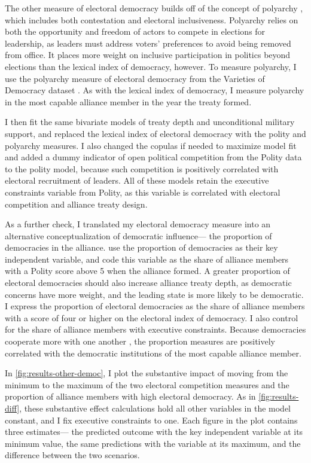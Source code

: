 \documentclass[12pt]{article}
\begin{document}
The other measure of electoral democracy builds off of the concept of polyarchy \citep{Dahl1971}, which includes both contestation and electoral inclusiveness. 
Polyarchy relies on both the opportunity and freedom of actors to compete in elections for leadership, as leaders must address voters' preferences to avoid being removed from office. 
It places more weight on inclusive participation in politics beyond elections than the lexical index of democracy, however. 
To measure polyarchy, I use the polyarchy measure of electoral democracy from the Varieties of Democracy dataset \citep{Teorelletal2016}.
As with the lexical index of democracy, I measure polyarchy in the most capable alliance member in the year the treaty formed.

 
I then fit the same bivariate models of treaty depth and unconditional military support, and replaced the lexical index of electoral democracy with the polity and polyarchy measures.
I also changed the copulas if needed to maximize model fit and added a dummy indicator of open political competition from the Polity data to the polity model, because such competition is positively correlated with electoral recruitment of leaders. 
All of these models retain the executive constraints variable from Polity, as this variable is correlated with electoral 
competition and alliance treaty design. 


As a further check, I translated my electoral democracy measure into an alternative conceptualization of democratic influence--- the proportion of democracies in the alliance.
\citet{Chibaetal2015} use the proportion of democracies as their key independent variable, and code this variable as the share of alliance members with a Polity score above 5 when the alliance formed. 
A greater proportion of electoral democracies should also increase alliance treaty depth, as democratic concerns have more weight, and the leading state is more likely to be democratic. 
I express the proportion of electoral democracies as the share of alliance members with a score of four or higher on the electoral index of democracy. 
I also control for the share of alliance members with executive constraints. 
Because democracies cooperate more with one another \citep{Leeds1999}, the proportion measures are positively correlated with the democratic institutions of the most capable alliance member. 


In \autoref{fig:results-other-democ}, I plot the substantive impact of moving from the minimum to the maximum of the two electoral competition measures and the proportion of alliance members with high electoral democracy. 
As in \autoref{fig:results-diff}, these substantive effect calculations hold all other variables in the model constant, and I fix executive constraints to one. 
Each figure in the plot contains three estimates--- the predicted outcome with the key independent variable at its minimum value, the same predictions with the variable at its maximum, and the difference between the two scenarios. 
\end{document}
